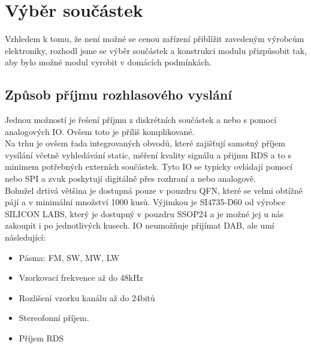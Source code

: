 \section{Výběr součástek}
\label{sec:Vyber}
Vzhledem k tomu, že není možné se cenou zařízení přiblížit zavedeným výrobcům elektroniky, rozhodl jsme se výběr součástek a konstrukci modulu přizpůsobit tak, aby bylo možné modul vyrobit v domácích podmínkách.

 
\subsection{Způsob příjmu rozhlasového vyslání}
Jednou možností je řešení příjmu z diskrétních součástek a nebo s pomocí analogových IO. Ovšem toto je příliš komplikované.\\
Na trhu je ovšem řada integrovaných obvodů, které zajišťují samotný příjem vysílání včetně vyhledávání static, měření kvality signálu a přijmu RDS a to s minimem potřebných externích součástek. Tyto IO se typicky ovládají pomocí \iic nebo SPI a zvuk poskytují digitálně přes rozhraní \iis a nebo analogově.\\
Bohužel drtivá většina je dostupná pouze v pouzdru QFN, které se velmi obtížně pájí a v minimální množství 1000 kusů. Výjimkou je SI4735-D60 od výrobce SILICON LABS, který je dostupný v pouzdru SSOP24 a je možné jej u nás zakoupit i po jednotlivých kusech. IO neumožňuje přijímat DAB, ale umí následující:
\begin{itemize}
\item{Pásma: FM, SW, MW, LW}
\item{Vzorkovací frekvence až do 48kHz}
\item{Rozlišení vzorku kanálu až do 24bitů}
\item{Stereofonní příjem.}
\item{Příjem RDS}
\end{itemize}

